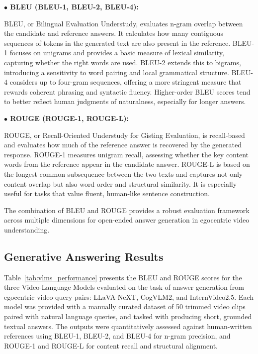 \documentclass[10pt,twocolumn,letterpaper]{article}
\begin{document}
\textbf{$\bullet$ BLEU (BLEU-1, BLEU-2, BLEU-4):}

BLEU, or Bilingual Evaluation Understudy, evaluates n-gram overlap between the candidate and reference answers. It calculates how many contiguous sequences of tokens in the generated text are also present in the reference. BLEU-1 focuses on unigrams and provides a basic measure of lexical similarity, capturing whether the right words are used. BLEU-2 extends this to bigrams, introducing a sensitivity to word pairing and local grammatical structure. BLEU-4 considers up to four-gram sequences, offering a more stringent measure that rewards coherent phrasing and syntactic fluency. Higher-order BLEU scores tend to better reflect human judgments of naturalness, especially for longer answers.

\textbf{$\bullet$ ROUGE (ROUGE-1, ROUGE-L):}

ROUGE, or Recall-Oriented Understudy for Gisting Evaluation, is recall-based and evaluates how much of the reference answer is recovered by the generated response. ROUGE-1 measures unigram recall, assessing whether the key content words from the reference appear in the candidate answer. ROUGE-L is based on the longest common subsequence between the two texts and captures not only content overlap but also word order and structural similarity. It is especially useful for tasks that value fluent, human-like sentence construction.

The combination of BLEU and ROUGE provides a robust evaluation framework across multiple dimensions for open-ended answer generation in egocentric video understanding.
	
	
	
\subsection{Generative Answering Results}


Table~\ref{tab:vlms_performance} presents the BLEU and ROUGE scores for the three Video-Language Models evaluated on the task of answer generation from egocentric video-query pairs: LLaVA-NeXT, CogVLM2, and InternVideo2.5. Each model was provided with a manually curated dataset of 50 trimmed video clips paired with natural language queries, and tasked with producing short, grounded textual answers. The outputs were quantitatively assessed against human-written references using BLEU-1, BLEU-2, and BLEU-4 for n-gram precision, and ROUGE-1 and ROUGE-L for content recall and structural alignment.
\end{document}
